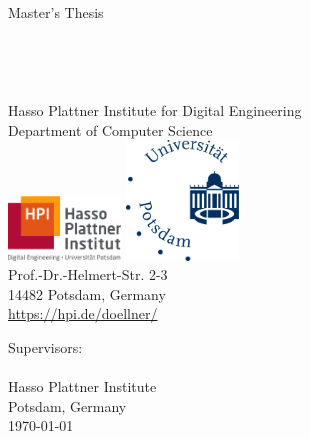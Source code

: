 \begin{titlepage}

\thispagestyle{empty}
\begin{center}
	\LARGE
	Master's Thesis\\
	\vspace{0.4cm}
	\Huge
    \TITLE{}\\
	\vspace{0.4cm}
	\large
    \SUBTITLE{}\\
	\vspace{0.5cm}
	\LARGE
	\textbf{\AUTHOR}\\
	\normalsize
  \Mail{\EMAIL}\\
	\vspace{0.4cm}
	\small
	Hasso Plattner Institute for Digital Engineering\\
	Department of Computer Science\\
	\vspace{0.4cm}
	\includegraphics[width=3cm]{figures/hpi_logo}
	\hspace{1cm}
	\includegraphics[width=3cm]{figures/Universitaet_Potsdam_logo}\\
	\vspace{0.4cm}
	Prof.-Dr.-Helmert-Str. 2-3\\
	14482 Potsdam, Germany\\
	\url{https://hpi.de/doellner/}\\
\end{center}
Supervisors:
\vspace{0.4cm}\\
\SUPERVISOR
\vspace{0.4cm}\\
Hasso Plattner Institute\\
Potsdam, Germany\\
\today
\end{titlepage}
